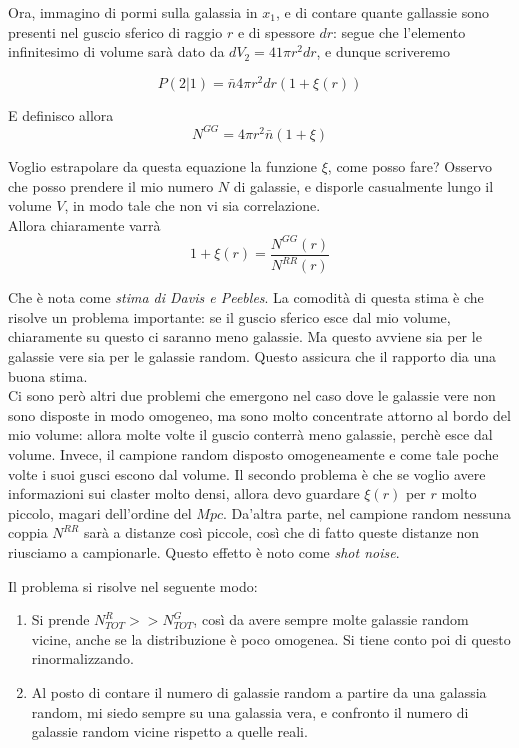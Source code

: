 \documentclass{report}
\begin{document}
{    Ora, immagino di pormi sulla galassia in $x_1$, e di contare quante gallassie sono presenti nel guscio sferico di raggio $r$ e di spessore $dr$: segue che l'elemento infinitesimo di volume sarà dato da $dV_2 = 41\pi r^2dr$, e dunque scriveremo

    \begin{equation}
        P(2|1) = \bar{n}4\pi r^2 dr(1+\xi(r))
    \end{equation}

    E definisco allora 
    \begin{equation}
        N^{GG} = 4\pi r^2 \bar{n}(1+\xi)
    \end{equation}

    Voglio estrapolare da questa equazione la funzione $\xi$, come posso fare? Osservo che posso prendere il mio numero $N$ di galassie, e disporle casualmente lungo il volume $V$, in modo tale che non vi sia correlazione. \\

    Allora chiaramente varrà 
    \begin{equation}
        1 + \xi (r) = \frac{N^{GG}(r)}{N^{RR}(r)}
    \end{equation}

    Che è nota come \emph{stima di Davis e Peebles}. La comodità di questa stima è che risolve un problema importante: se il guscio sferico esce dal mio volume, chiaramente su questo ci saranno meno galassie. Ma questo avviene sia per le galassie vere sia per le galassie random. Questo assicura che il rapporto dia una buona stima. \\

    Ci sono però altri due problemi che emergono nel caso dove le galassie vere non sono disposte in modo omogeneo, ma sono molto concentrate attorno al bordo del mio volume: allora molte volte il guscio conterrà meno galassie, perchè esce dal volume. Invece, il campione random disposto omogeneamente e come tale poche volte i suoi gusci escono dal volume. Il secondo problema è che se voglio avere informazioni sui claster molto densi, allora devo guardare $\xi(r)$ per $r$ molto piccolo, magari dell'ordine del $Mpc$. Da'altra parte, nel campione random nessuna coppia $N^{RR}$ sarà a distanze così piccole, così che di fatto queste distanze non riusciamo a campionarle. Questo effetto è noto come \emph{shot noise}. 
    
    Il problema si risolve nel seguente modo: 
    \begin{enumerate}
        \item 
        Si prende $N_{TOT}^R >> N_{TOT}^G$, così da avere sempre molte galassie random vicine, anche se la distribuzione è poco omogenea. Si tiene conto poi di questo rinormalizzando. 
        \item 
        Al posto di contare il numero di galassie random a partire da una galassia random, mi siedo sempre su una galassia vera, e confronto il numero di galassie random vicine rispetto a quelle reali. 
    \end{enumerate}

}
\end{document}
